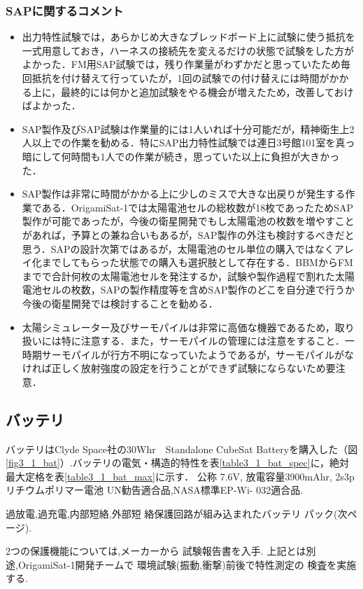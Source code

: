 \subsubsection{SAPに関するコメント}
\begin{itemize}
	\item 出力特性試験では，あらかじめ大きなブレッドボード上に試験に使う抵抗を一式用意しておき，ハーネスの接続先を変えるだけの状態で試験をした方がよかった．FM用SAP試験では，残り作業量がわずかだと思っていたため毎回抵抗を付け替えて行っていたが，1回の試験での付け替えには時間がかかる上に，最終的には何かと追加試験をやる機会が増えたため，改善しておけばよかった．
	\item SAP製作及びSAP試験は作業量的には1人いれば十分可能だが，精神衛生上2人以上での作業を勧める．特にSAP出力特性試験では連日3号館101室を真っ暗にして何時間も1人での作業が続き，思っていた以上に負担が大きかった．
	\item SAP製作は非常に時間がかかる上に少しのミスで大きな出戻りが発生する作業である．OrigamiSat-1では太陽電池セルの総枚数が18枚であったためSAP製作が可能であったが，今後の衛星開発でもし太陽電池の枚数を増やすことがあれば，予算との兼ね合いもあるが，SAP製作の外注も検討するべきだと思う．SAPの設計次第ではあるが，太陽電池のセル単位の購入ではなくアレイ化までしてもらった状態での購入も選択肢として存在する．BBMからFMまでで合計何枚の太陽電池セルを発注するか，試験や製作過程で割れた太陽電池セルの枚数，SAPの製作精度等を含めSAP製作のどこを自分達で行うか今後の衛星開発では検討することを勧める．
	\item 太陽シミュレーター及びサーモパイルは非常に高価な機器であるため，取り扱いには特に注意する．また，サーモパイルの管理には注意をすること．一時期サーモパイルが行方不明になっていたようであるが，サーモパイルがなければ正しく放射強度の設定を行うことができず試験にならないため要注意．
\end{itemize}


\subsection{バッテリ}
バッテリはClyde Space社の30Whr　Standalone CubeSat Batteryを購入した（図\ref{fig3_1_bat}）.バッテリの電気・構造的特性を表\ref{table3_1_bat_spec}に，絶対最大定格を表\ref{table3_1_bat_max}に示す．
公称 7.6V, 放電容量3900mAhr,
2s3p リチウムポリマー電池
UN勧告適合品,NASA標準EP-Wi-
032適合品.

過放電,過充電,内部短絡,外部短
絡保護回路が組み込まれたバッテリ
パック(次ページ).

2つの保護機能については,メーカーから
試験報告書を入手.
上記とは別途,OrigamiSat-1開発チームで
環境試験(振動,衝撃)前後で特性測定の
検査を実施する.

